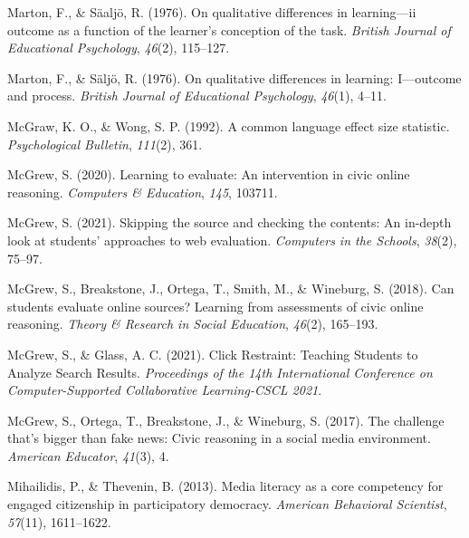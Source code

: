 \documentclass[letterpaper, nobind]{templates/ociamthesis}
\newlength{\cslhangindent}
\newenvironment{CSLReferences}[2] %
 {%
  \setlength{\parindent}{0pt}
  \ifodd #1
  \let\oldpar\par
  \def\par{\hangindent=\cslhangindent\oldpar}
  \fi
  \setlength{\parskip}{1mm}
  \setlength{\baselineskip}{6mm}
 }%
 {}
\begin{document}
\begin{CSLReferences}{1}{0}
\leavevmode{}%
Marton, F., \& Säaljö, R. (1976). On qualitative differences in learning---ii outcome as a function of the learner's conception of the task. \emph{British Journal of Educational Psychology}, \emph{46}(2), 115--127.

\leavevmode{}%
Marton, F., \& Säljö, R. (1976). On qualitative differences in learning: I---outcome and process. \emph{British Journal of Educational Psychology}, \emph{46}(1), 4--11.

\leavevmode{}%
McGraw, K. O., \& Wong, S. P. (1992). A common language effect size statistic. \emph{Psychological Bulletin}, \emph{111}(2), 361.

\leavevmode{}%
McGrew, S. (2020). Learning to evaluate: An intervention in civic online reasoning. \emph{Computers \& Education}, \emph{145}, 103711.

\leavevmode{}%
McGrew, S. (2021). Skipping the source and checking the contents: An in-depth look at students' approaches to web evaluation. \emph{Computers in the Schools}, \emph{38}(2), 75--97.

\leavevmode{}%
McGrew, S., Breakstone, J., Ortega, T., Smith, M., \& Wineburg, S. (2018). Can students evaluate online sources? Learning from assessments of civic online reasoning. \emph{Theory \& Research in Social Education}, \emph{46}(2), 165--193.

\leavevmode{}%
McGrew, S., \& Glass, A. C. (2021). Click {Restraint}: Teaching {Students} to {Analyze Search Results}. \emph{Proceedings of the 14th {International Conference} on {Computer}-{Supported Collaborative Learning}-{CSCL} 2021}.

\leavevmode{}%
McGrew, S., Ortega, T., Breakstone, J., \& Wineburg, S. (2017). The challenge that's bigger than fake news: Civic reasoning in a social media environment. \emph{American Educator}, \emph{41}(3), 4.

\leavevmode{}%
Mihailidis, P., \& Thevenin, B. (2013). Media literacy as a core competency for engaged citizenship in participatory democracy. \emph{American Behavioral Scientist}, \emph{57}(11), 1611--1622.


\end{CSLReferences}
\end{document}
